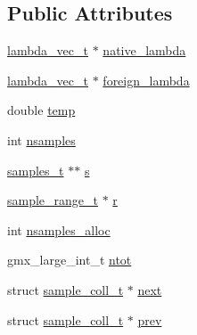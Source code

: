 \subsection*{\-Public \-Attributes}
\begin{DoxyCompactItemize}
\item 
\hyperlink{structlambda__vec__t}{lambda\-\_\-vec\-\_\-t} $\ast$ \hyperlink{structsample__coll__t_a9a61eaedd2791d72c64d4005feae14cf}{native\-\_\-lambda}
\item 
\hyperlink{structlambda__vec__t}{lambda\-\_\-vec\-\_\-t} $\ast$ \hyperlink{structsample__coll__t_a4adb6e8e09af8427701909139e61ab00}{foreign\-\_\-lambda}
\item 
double \hyperlink{structsample__coll__t_a49a66a28958741147fdd421f089d045f}{temp}
\item 
int \hyperlink{structsample__coll__t_ad622ee8c76b4947f3ef92194a0d703d6}{nsamples}
\item 
\hyperlink{structsamples__t}{samples\-\_\-t} $\ast$$\ast$ \hyperlink{structsample__coll__t_a1745ebd0a689532ddbaf90b93b7dcca8}{s}
\item 
\hyperlink{structsample__range__t}{sample\-\_\-range\-\_\-t} $\ast$ \hyperlink{structsample__coll__t_acf4da45f3ec8d738199eccb76e6274f3}{r}
\item 
int \hyperlink{structsample__coll__t_a51ff911a9247187821b0745b5d059240}{nsamples\-\_\-alloc}
\item 
gmx\-\_\-large\-\_\-int\-\_\-t \hyperlink{structsample__coll__t_a76b661b37e1068f43a9c41f95a6ef787}{ntot}
\item 
struct \hyperlink{structsample__coll__t}{sample\-\_\-coll\-\_\-t} $\ast$ \hyperlink{structsample__coll__t_ad7c5e688f7955ca81142fd9e568bddf8}{next}
\item 
struct \hyperlink{structsample__coll__t}{sample\-\_\-coll\-\_\-t} $\ast$ \hyperlink{structsample__coll__t_a2d147b0ed30dd26a1c0294689f06eaaf}{prev}
\end{DoxyCompactItemize}


